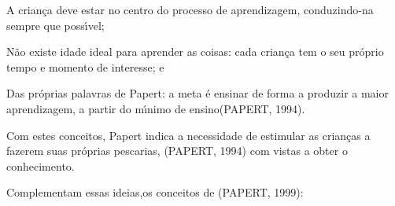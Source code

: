 \documentclass[
12pt,		%
openright,	%
twoside,  %
a4paper,			%
chapter=TITLE,		%
english,			%
french,				%
spanish,			%
brazil				%
]{USPSC-classe/USPSC}
\begin{document}
\begin{alineas}
\item A crian\c{c}a deve estar no centro do processo de aprendizagem, conduzindo-na sempre que poss\'{\i}vel;
\item N\~ao existe idade ideal para aprender as coisas: cada crian\c{c}a tem o seu pr\'oprio tempo e momento de interesse; e
\item Das pr\'oprias palavras de Papert: \textquotedbl a meta \'e ensinar de forma a produzir a maior aprendizagem, a partir do m\'{\i}nimo de ensino\textquotedbl   (PAPERT, 1994).
\end{alineas}

Com estes conceitos, Papert indica a necessidade de estimular as crian\c{c}as a fazerem suas pr\'oprias pescarias,  (PAPERT, 1994) com vistas a obter o conhecimento.

















Complementam essas ideias,os conceitos de  (PAPERT, 1999):
\end{document}
